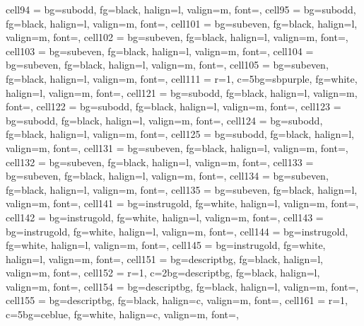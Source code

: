 \documentclass[a4paper,12pt]{article}
\begin{document}
\begin{longtblr}
{  cell{9}{4}  = {bg=subodd,  fg=black, halign=l, valign=m, font=\footnotesize},
  cell{9}{5}  = {bg=subodd,  fg=black, halign=l, valign=m, font=\footnotesize},
  cell{10}{1} = {bg=subeven, fg=black, halign=l, valign=m, font=\footnotesize},
  cell{10}{2} = {bg=subeven, fg=black, halign=l, valign=m, font=\footnotesize},
  cell{10}{3} = {bg=subeven, fg=black, halign=l, valign=m, font=\footnotesize},
  cell{10}{4} = {bg=subeven, fg=black, halign=l, valign=m, font=\footnotesize},
  cell{10}{5} = {bg=subeven, fg=black, halign=l, valign=m, font=\footnotesize},
  cell{11}{1} = {r=1, c=5}{bg=sbpurple, fg=white, halign=l, valign=m, font=\small\bfseries},
  cell{12}{1} = {bg=subodd,  fg=black, halign=l, valign=m, font=\footnotesize},
  cell{12}{2} = {bg=subodd,  fg=black, halign=l, valign=m, font=\footnotesize},
  cell{12}{3} = {bg=subodd,  fg=black, halign=l, valign=m, font=\footnotesize},
  cell{12}{4} = {bg=subodd,  fg=black, halign=l, valign=m, font=\footnotesize},
  cell{12}{5} = {bg=subodd,  fg=black, halign=l, valign=m, font=\footnotesize},
  cell{13}{1} = {bg=subeven, fg=black, halign=l, valign=m, font=\footnotesize},
  cell{13}{2} = {bg=subeven, fg=black, halign=l, valign=m, font=\footnotesize},
  cell{13}{3} = {bg=subeven, fg=black, halign=l, valign=m, font=\footnotesize},
  cell{13}{4} = {bg=subeven, fg=black, halign=l, valign=m, font=\footnotesize},
  cell{13}{5} = {bg=subeven, fg=black, halign=l, valign=m, font=\footnotesize},
  cell{14}{1} = {bg=instrugold, fg=white, halign=l, valign=m, font=\footnotesize},
  cell{14}{2} = {bg=instrugold, fg=white, halign=l, valign=m, font=\footnotesize},
  cell{14}{3} = {bg=instrugold, fg=white, halign=l, valign=m, font=\footnotesize},
  cell{14}{4} = {bg=instrugold, fg=white, halign=l, valign=m, font=\footnotesize},
  cell{14}{5} = {bg=instrugold, fg=white, halign=l, valign=m, font=\footnotesize},
  cell{15}{1} = {bg=descriptbg, fg=black, halign=l, valign=m, font=\footnotesize},
  cell{15}{2} = {r=1, c=2}{bg=descriptbg, fg=black, halign=l, valign=m, font=\footnotesize},
  cell{15}{4} = {bg=descriptbg, fg=black, halign=l, valign=m, font=\footnotesize},
  cell{15}{5} = {bg=descriptbg, fg=black, halign=c, valign=m, font=\footnotesize\bfseries},
  cell{16}{1} = {r=1, c=5}{bg=ceblue, fg=white, halign=c, valign=m, font=\small\bfseries},
}
\end{longtblr}
\end{document}

